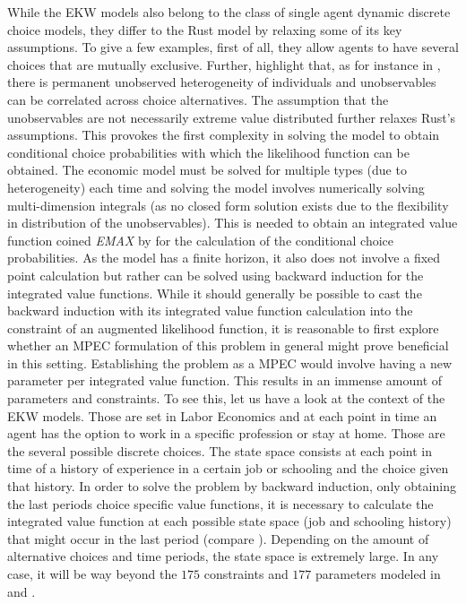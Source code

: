 While the EKW models also belong to the class of single agent dynamic discrete choice models, they differ to the Rust model by relaxing some of its key assumptions. To give a few examples, first of all, they allow agents to have several choices that are mutually exclusive. Further, \cite{Aguirregabiri.2010} highlight that, as for instance in \cite{Keane.1994}, there is permanent unobserved heterogeneity of individuals and unobservables can be correlated across choice alternatives. The assumption that the unobservables are not necessarily extreme value distributed further relaxes Rust's assumptions. This provokes the first complexity in solving the model to obtain conditional choice probabilities with which the likelihood function can be obtained. The economic model must be solved for multiple types (due to heterogeneity) each time and solving the model involves numerically solving multi-dimension integrals (as no closed form solution exists due to the flexibility in distribution of the unobservables). This is needed to obtain an integrated value function coined \textit{EMAX} by \cite{Keane.1994} for the calculation of the conditional choice probabilities. As the model has a finite horizon, it also does not involve a fixed point calculation but rather can be solved using backward induction for the integrated value functions. While it should generally be possible to cast the backward induction with its integrated value function calculation into the constraint of an augmented likelihood function, it is reasonable to first explore whether an MPEC formulation of this problem in general might prove beneficial in this setting. Establishing the problem as a MPEC would involve having a new parameter per integrated value function. This results in an immense amount of parameters and constraints. To see this, let us have a look at the context of the EKW models. Those are set in Labor Economics and at each point in time an agent has the option to work in a specific profession or stay at home. Those are the several possible discrete choices. The state space consists at each point in time of a history of experience in a certain job or schooling and the choice given that history. In order to solve the problem by backward induction, only obtaining the last periods choice specific value functions, it is necessary to calculate the integrated value function at each possible state space (job and schooling history)  that might occur in the last period (compare \cite{Aguirregabiri.2010, Keane.1994, Keane.1997}). Depending on the amount of alternative choices and time periods, the state space is extremely large. In any case, it will be way beyond the $175$ constraints and $177$ parameters modeled in \cite{Su.Judd.2012} and \cite{Iskhakov.2016}.

